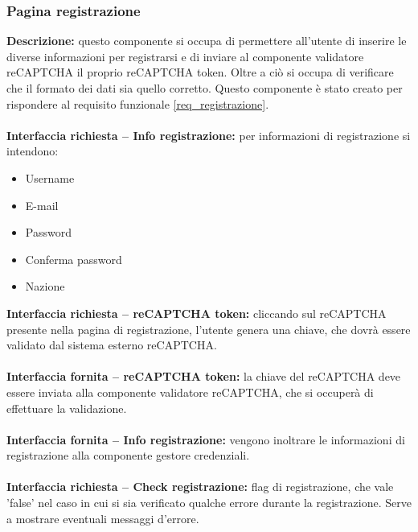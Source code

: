 \subsubsection{Pagina registrazione}
\textbf{Descrizione: }questo componente si occupa di permettere all'utente di inserire le diverse informazioni per registrarsi e di inviare al componente validatore reCAPTCHA il proprio reCAPTCHA token. Oltre a ciò si occupa di verificare che il formato dei dati sia quello corretto. Questo componente è stato creato per rispondere al requisito funzionale \ref{req_registrazione}. \\
\\
\textbf{Interfaccia richiesta – Info registrazione: }per informazioni di registrazione si intendono:
\begin{itemize}
    \item Username
    \item E-mail
    \item Password
    \item Conferma password
    \item Nazione
\end{itemize}
\noindent
\textbf{Interfaccia richiesta – reCAPTCHA token: }cliccando sul reCAPTCHA presente nella pagina di registrazione, l'utente genera una chiave, che dovrà essere validato dal sistema esterno reCAPTCHA. \\
\\
\textbf{Interfaccia fornita – reCAPTCHA token: }la chiave del reCAPTCHA deve essere inviata alla componente validatore reCAPTCHA, che si occuperà di effettuare la validazione. \\
\\
\textbf{Interfaccia fornita – Info registrazione: }vengono inoltrare le informazioni di registrazione alla componente gestore credenziali. \\
\\
\textbf{Interfaccia richiesta – Check registrazione: }flag di registrazione, che vale 'false' nel caso in cui si sia verificato qualche errore durante la registrazione. Serve a mostrare eventuali messaggi d'errore.

